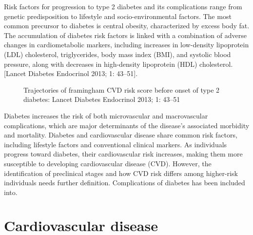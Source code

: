 \documentclass[
  a4paper,
  headsepline=true,
  open=any]{scrbook}
\begin{document}
Risk factors for progression to type 2 diabetes and its complications
range from genetic predisposition to lifestyle and socio-environmental
factors. The most common precursor to diabetes is central obesity,
characterized by excess body fat. The accumulation of diabetes risk
factors is linked with a combination of adverse changes in
cardiometabolic markers, including increases in low-density lipoprotein
(LDL) cholesterol, triglycerides, body mass index (BMI), and systolic
blood pressure, along with decreases in high-density lipoprotein (HDL)
cholesterol. {[}Lancet Diabetes Endocrinol 2013; 1: 43--51{]}.

\begin{figure}

\begin{minipage}[t]{\linewidth}

{\centering 


\caption{Trajectories of framingham CVD risk score before onset of type
2 diabetes: Lancet Diabetes Endocrinol 2013; 1: 43--51}

}

\end{minipage}%

\end{figure}

Diabetes increases the risk of both microvascular and macrovascular
complications, which are major determinants of the disease's associated
morbidity and mortality. Diabetes and cardiovascular disease share
common risk factors, including lifestyle factors and conventional
clinical markers. As individuals progress toward diabetes, their
cardiovascular risk increases, making them more susceptible to
developing cardiovascular disease (CVD). However, the identification of
preclinical stages and how CVD risk differs among higher-risk
individuals needs further definition. Complications of diabetes has been
included into.


\hypertarget{cardiovascular-disease}{%
\chapter{Cardiovascular disease}\label{cardiovascular-disease}}
\end{document}
